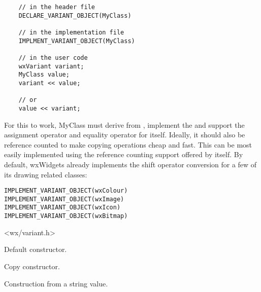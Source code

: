 \begin{verbatim}
    // in the header file
    DECLARE_VARIANT_OBJECT(MyClass)
    
    // in the implementation file
    IMPLMENT_VARIANT_OBJECT(MyClass)
    
    // in the user code
    wxVariant variant;
    MyClass value;
    variant << value;
    
    // or
    value << variant;
\end{verbatim}

For this to work, MyClass must derive from , implement
the 
and support the assignment operator and equality operator for itself. Ideally, it
should also be reference counted to make copying operations cheap and fast. This
can be most easily implemented using the reference counting support offered by
 itself. By default, wxWidgets already implements
the shift operator conversion for a few of its drawing related classes:

\begin{verbatim}
IMPLEMENT_VARIANT_OBJECT(wxColour)
IMPLEMENT_VARIANT_OBJECT(wxImage)
IMPLEMENT_VARIANT_OBJECT(wxIcon)
IMPLEMENT_VARIANT_OBJECT(wxBitmap)
\end{verbatim}




<wx/variant.h>




\label{wxvariantctor}


Default constructor.


Copy constructor.



Construction from a string value.

